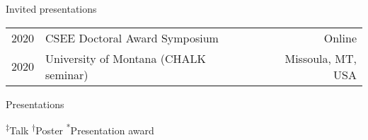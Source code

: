 \documentclass[11pt]{article}
\begin{document}
\vspace{0.5em}


\noindent
\begin{rSection}{Invited presentations} %
\begin{tabular}{llr}

2020 & CSEE Doctoral Award Symposium & Online \\ 
2020 & University of Montana (CHALK seminar) & Missoula, MT, USA\\
\end{tabular}

\end{rSection}
\vspace{1em}

\noindent
\begin{rSection}{Presentations} %


\textsuperscript{$\ddagger$}Talk
\textsuperscript{$\dag$}Poster
\textsuperscript{*}Presentation award

\vspace{0.5em}
\noindent
\begin{tabular}{llr}


\end{tabular}
\end{rSection}
\end{document}
